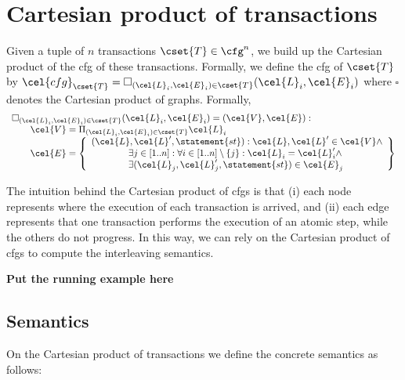 \section{Cartesian product of transactions}
Given a tuple of $n$ transactions $\cset{T} \in \cfg^n$, we build up the Cartesian product of the cfg of these transactions. Formally, we define the cfg of $\cset{T}$ by $\cel{cfg}_{\cset{T}} = \square_{(\cel{L}_i, \cel{E}_{i}) \in \cset{T}} (\cel{L}_i, \cel{E}_{i})$ where $\square$ denotes the Cartesian product of graphs. Formally,
\[
\begin{array}{l}
\square_{(\cel{L}_i, \cel{E}_{i}) \in \cset{T}} (\cel{L}_i, \cel{E}_{i}) = (\cel{V}, \cel{E}) :\\
\hspace{20pt} \cel{V}=\Pi_{(\cel{L}_i, \cel{E}_{i}) \in \cset{T}} \cel{L}_i\\
\hspace{20pt} \cel{E}=
\left\{
\begin{array}{l}
(\cel{L}, \cel{L}', \statement{st}) : \cel{L}, \cel{L}' \in \cel{V} \land\\
\hspace{40pt} \exists j \in [1..n] : \forall i \in [1..n] \setminus \{j\}  : \cel{L}_i=\cel{L}'_i \land\\
\hspace{40pt} \exists (\cel{L}_j, \cel{L}'_j, \statement{st}) \in \cel{E}_j\\
\end{array}
\right\}
\end{array}
\]

The intuition behind the Cartesian product of cfgs is that (i) each node represents where the execution of each transaction is arrived, and (ii) each edge represents that one transaction performs the execution of an atomic step, while the others do not progress. In this way, we can rely on the Cartesian product of cfgs to compute the interleaving semantics.

\textbf{Put the running example here}

\subsection{Semantics}
On the Cartesian product of transactions we define the concrete semantics as follows:

